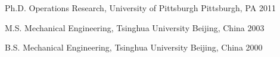 
\begin{cvhonors}

  \cvhonor
    {Ph.D.}                                                     %
    {Operations Research, University of Pittsburgh}             %
    {Pittsburgh, PA}                                            %
    {2011}                                                      %

  \cvhonor
    {M.S.}    %
    {Mechanical Engineering, Tsinghua University}               %
    {Beijing, China}                    %
    {2003}                              %

  \cvhonor
    {B.S.}    %
    {Mechanical Engineering, Tsinghua University}               %
    {Beijing, China}                    %
    {2000}                              %

\end{cvhonors}

